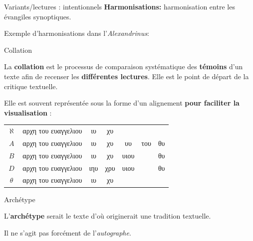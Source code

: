 \documentclass[11pt]{beamer}
\begin{document}
\begin{frame}{Variants/lectures : intentionnels}
\textbf{Harmonisations:} harmonisation entre les évangiles synoptiques.\\

\begin{block}{}
    Exemple d'harmonisations dans l'\textit{Alexandrinus}:
\end{block}

\end{frame}

\begin{frame}{Collation}
    \begin{alertblock}{}
    La \textbf{collation} est le processus de comparaison systématique des \textbf{témoins} d'un texte afin de recenser les \textbf{différentes lectures}. Elle est le point de départ de la critique textuelle.
    \end{alertblock}
    Elle est souvent représentée sous la forme d'un alignement \textbf{pour faciliter la visualisation} :
\pause

\vfill
\begin{tabular}{c|c|c|c|c|c|c}
    $\aleph$ & \textgreek{αρχη του ευαγγελιου} & \textgreek{ιυ} & \textgreek{χυ} & & & \\
    $A$  & \textgreek{αρχη του ευαγγελιου} & \textgreek{ιυ}  & \textgreek{χυ} & \textgreek{υυ} & \textgreek{του} & \textgreek{θυ}\\
    $B$ & \textgreek{αρχη του ευαγγελιου} & \textgreek{ιυ} & \textgreek{χυ} & \textgreek{υιου} & & \textgreek{θυ}\\
    $D$ & \textgreek{αρχη του ευαγγελιου} & \textgreek{ιηυ} & \textgreek{χρυ} & \textgreek{υιου} & & \textgreek{θυ}\\
    $\theta$ & \textgreek{αρχη του ευαγγελιου} & \textgreek{ιυ} & \textgreek{χυ} & & & \\
\end{tabular}
\end{frame}

\begin{frame}{Archétype}
    \begin{alertblock}{}
    L'\textbf{archétype} serait le texte d'où originerait une tradition textuelle.
    \end{alertblock}

    Il ne s'agit pas forcément de l'\emph{autographe}.
\end{frame}
\end{document}

